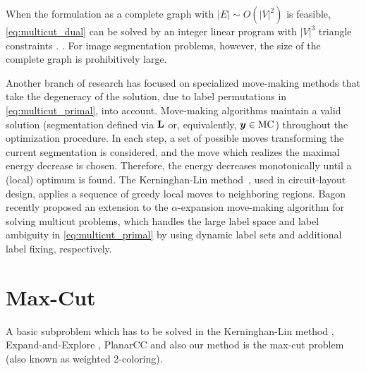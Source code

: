 When the formulation as a complete graph
with $| E | \sim O(| V|^2)$
is feasible, \eqref{eq:multicut_dual} can be solved by an integer linear program with
$| V|^3$ triangle constraints \cite{chopra_1993_mp,alush_2012_pami,finley_2005_ml}.
.
For image segmentation problems, however, the size of the complete graph is
prohibitively large.

%

Another branch of research has focused on specialized move-making methods
\cite{kerninghan_1970_bell,zhao_2005_mp,bagon_2011_arxiv}
that take the degeneracy of the solution,
due to label permutations in \eqref{eq:multicut_primal}, into account.
%
Move-making algorithms maintain a valid solution (segmentation defined 
via $\mathbf{L}$ or, equivalently, $\boldsymbol y \in \text{MC}$) throughout the
optimization procedure. In each step, a set of possible moves transforming
the current segmentation is considered,
and the move which realizes the maximal
energy decrease is chosen. Therefore, the energy decreases monotonically
until a (local) optimum is found.
%
The Kerninghan-Lin method~\cite{kerninghan_1970_bell},
used in circuit-layout design, applies a sequence of 
greedy local moves to neighboring regions.
Bagon~\cite{bagon_2011_arxiv} recently proposed an 
extension to the
$\alpha$-expansion move-making algorithm
for solving multicut problems, which handles the large label space
and label ambiguity in \eqref{eq:multicut_primal} by using dynamic label
sets and additional label fixing, respectively.







\section{Max-Cut\label{sec:max_cut}}
A basic subproblem which has to be solved in
the Kerninghan-Lin method \cite{kerninghan_1970_bell},
Expand-and-Explore \cite{bagon_2011_arxiv},
PlanarCC \cite{yarkony_2012_eccv} and also our method is the
max-cut problem \cite{deza1997geometry} (also known as weighted 2-coloring).

